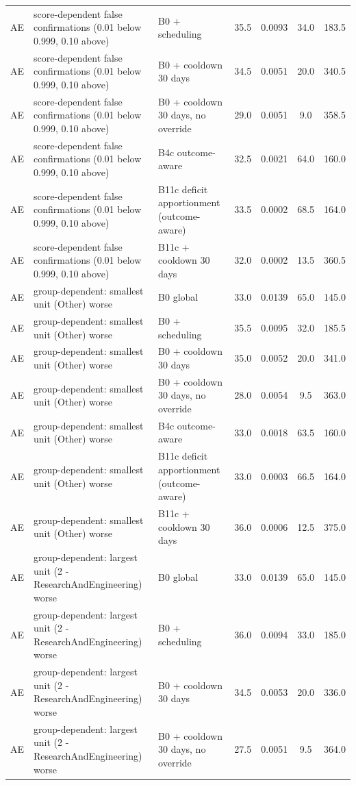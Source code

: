 \documentclass[10pt,onecolumn,letterpaper]{article}
\begin{document}
\begin{longtable}{lp{5.2cm}p{4.4cm}cccc}
AE & score-dependent false confirmations (0.01 below 0.999, 0.10 above) & B0 + scheduling & 35.5 & 0.0093 & 34.0 & 183.5 \\
AE & score-dependent false confirmations (0.01 below 0.999, 0.10 above) & B0 + cooldown 30 days & 34.5 & 0.0051 & 20.0 & 340.5 \\
AE & score-dependent false confirmations (0.01 below 0.999, 0.10 above) & B0 + cooldown 30 days, no override & 29.0 & 0.0051 & 9.0 & 358.5 \\
AE & score-dependent false confirmations (0.01 below 0.999, 0.10 above) & B4c outcome-aware & 32.5 & 0.0021 & 64.0 & 160.0 \\
AE & score-dependent false confirmations (0.01 below 0.999, 0.10 above) & B11c deficit apportionment (outcome-aware) & 33.5 & 0.0002 & 68.5 & 164.0 \\
AE & score-dependent false confirmations (0.01 below 0.999, 0.10 above) & B11c + cooldown 30 days & 32.0 & 0.0002 & 13.5 & 360.5 \\
AE & group-dependent: smallest unit (Other) worse & B0 global & 33.0 & 0.0139 & 65.0 & 145.0 \\
AE & group-dependent: smallest unit (Other) worse & B0 + scheduling & 35.5 & 0.0095 & 32.0 & 185.5 \\
AE & group-dependent: smallest unit (Other) worse & B0 + cooldown 30 days & 35.0 & 0.0052 & 20.0 & 341.0 \\
AE & group-dependent: smallest unit (Other) worse & B0 + cooldown 30 days, no override & 28.0 & 0.0054 & 9.5 & 363.0 \\
AE & group-dependent: smallest unit (Other) worse & B4c outcome-aware & 33.0 & 0.0018 & 63.5 & 160.0 \\
AE & group-dependent: smallest unit (Other) worse & B11c deficit apportionment (outcome-aware) & 33.0 & 0.0003 & 66.5 & 164.0 \\
AE & group-dependent: smallest unit (Other) worse & B11c + cooldown 30 days & 36.0 & 0.0006 & 12.5 & 375.0 \\
AE & group-dependent: largest unit (2 - ResearchAndEngineering) worse & B0 global & 33.0 & 0.0139 & 65.0 & 145.0 \\
AE & group-dependent: largest unit (2 - ResearchAndEngineering) worse & B0 + scheduling & 36.0 & 0.0094 & 33.0 & 185.0 \\
AE & group-dependent: largest unit (2 - ResearchAndEngineering) worse & B0 + cooldown 30 days & 34.5 & 0.0053 & 20.0 & 336.0 \\
AE & group-dependent: largest unit (2 - ResearchAndEngineering) worse & B0 + cooldown 30 days, no override & 27.5 & 0.0051 & 9.5 & 364.0 \\

\end{longtable}
\end{document}
